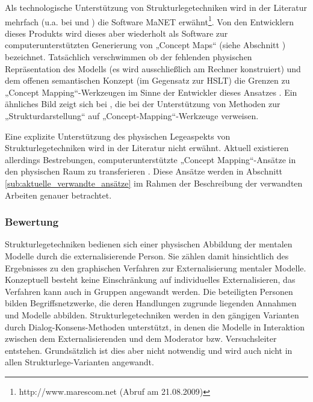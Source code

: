 Als technologische Unterstützung von Strukturlegetechniken wird in der Literatur mehrfach (u.a. bei \citep{Huss03} und \citep{Ifenthaler06}) die Software \gls{MaNET} \citep{Eckert98} erwähnt\footnote{http://www.marescom.net (Abruf am 21.08.2009)}. Von den Entwicklern dieses Produkts wird dieses aber wiederholt als Software zur computerunterstützten Generierung von „Concept Maps“ (siehe Abschnitt \label{sub:concept_mapping}) bezeichnet. Tatsächlich verschwimmen ob der fehlenden physischen Repräsentation des Modells (es wird ausschließlich am Rechner konstruiert) und dem offenen semantischen Konzept (im Gegensatz zur \gls{HSLT}) die Grenzen zu „Concept Mapping“-Werkzeugen im Sinne der Entwickler dieses Ansatzes \citep{Novak06}. Ein ähnliches Bild zeigt sich bei \citep{Mandl00}, die bei der Unterstützung von Methoden zur „Strukturdarstellung“ auf „Concept-Mapping“-Werkzeuge verweisen.

Eine explizite Unterstützung des physischen Legeaspekts von Strukturlegetechniken wird in der Literatur nicht erwähnt. Aktuell existieren allerdings Bestrebungen, computerunterstützte „Concept Mapping“-Ansätze in den physischen Raum zu transferieren \citep{Do-Lenh09} \citep{Tanenbaum09}. Diese Ansätze werden in Abschnitt \ref{sub:aktuelle_verwandte_ansätze} im Rahmen der Beschreibung der verwandten Arbeiten genauer betrachtet.

\subsubsection{Bewertung}

Strukturlegetechniken bedienen sich einer physischen Abbildung der mentalen Modelle durch die externalisierende Person. Sie zählen damit hinsichtlich des Ergebnisses zu den graphischen Verfahren zur Externalisierung mentaler Modelle. Konzeptuell besteht keine Einschränkung auf individuelles Externalisieren, das Verfahren kann auch in Gruppen angewandt werden. Die beteiligten Personen bilden Begriffsnetzwerke, die deren Handlungen zugrunde liegenden Annahmen und Modelle abbilden. Strukturlegetechniken werden in den gängigen Varianten durch Dialog-Konsens-Methoden unterstützt, in denen die Modelle in Interaktion zwischen dem Externalisierenden und dem Moderator bzw. Versuchsleiter entstehen. Grundsätzlich ist dies aber nicht notwendig und wird auch nicht in allen Strukturlege-Varianten angewandt.

